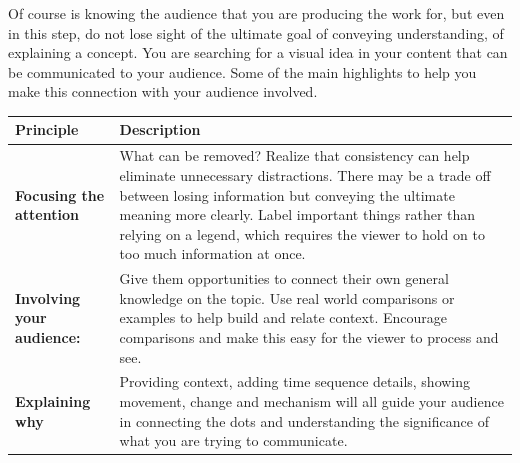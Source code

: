 \documentclass[]{book}
\theoremstyle{definition}
\theoremstyle{definition}
\theoremstyle{definition}
\theoremstyle{remark}
\begin{document}
Of course is knowing the audience that you are producing the work for,
but even in this step, do not lose sight of the ultimate goal of
conveying understanding, of explaining a concept. You are searching for
a visual idea in your content that can be communicated to your audience.
Some of the main highlights to help you make this connection with your
audience involved.

\begin{longtable}[]{@{}ll@{}}
\toprule
\begin{minipage}[b]{0.16\columnwidth}\raggedright\strut
\textbf{Principle}\strut
\end{minipage} & \begin{minipage}[b]{0.78\columnwidth}\raggedright\strut
\textbf{Description}\strut
\end{minipage}\tabularnewline
\midrule
\endhead
\begin{minipage}[t]{0.16\columnwidth}\raggedright\strut
\textbf{Focusing the attention}\strut
\end{minipage} & \begin{minipage}[t]{0.78\columnwidth}\raggedright\strut
What can be removed? Realize that consistency can help eliminate
unnecessary distractions. There may be a trade off between losing
information but conveying the ultimate meaning more clearly. Label
important things rather than relying on a legend, which requires the
viewer to hold on to too much information at once.\strut
\end{minipage}\tabularnewline
\begin{minipage}[t]{0.16\columnwidth}\raggedright\strut
\textbf{Involving your audience:}\strut
\end{minipage} & \begin{minipage}[t]{0.78\columnwidth}\raggedright\strut
Give them opportunities to connect their own general knowledge on the
topic. Use real world comparisons or examples to help build and relate
context. Encourage comparisons and make this easy for the viewer to
process and see.\strut
\end{minipage}\tabularnewline
\begin{minipage}[t]{0.16\columnwidth}\raggedright\strut
\textbf{Explaining why}\strut
\end{minipage} & \begin{minipage}[t]{0.78\columnwidth}\raggedright\strut
Providing context, adding time sequence details, showing movement,
change and mechanism will all guide your audience in connecting the dots
and understanding the significance of what you are trying to
communicate.\strut
\end{minipage}\tabularnewline
\bottomrule
\end{longtable}
\end{document}
